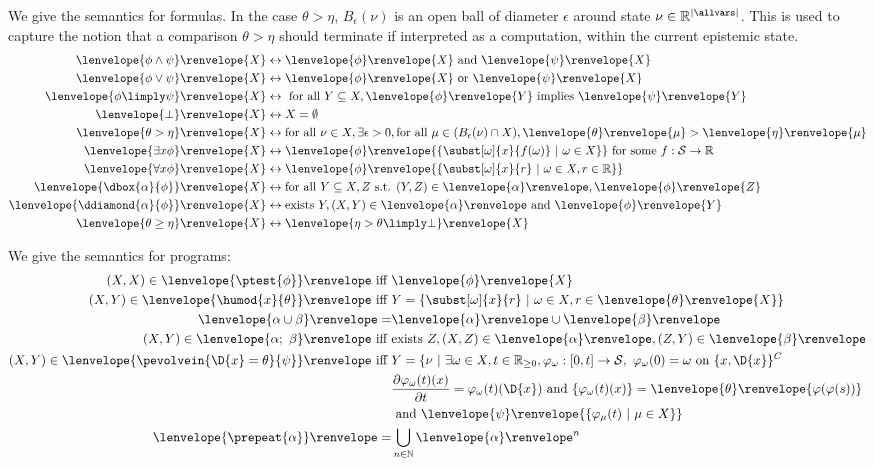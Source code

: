 \documentclass[12pt]{cmuthesis}
\theoremstyle{definition}
\theoremstyle{remark}
\newcommand{\ivr}{\psi}
\newcommand{\allstate}{\mathcal{S}}
\newcommand{\lequiv}{\leftrightarrow}
\newcommand{\om}{\omega}
\newcommand{\tint}[2]{\lenvelope{#1}\renvelope{#2}}
\newcommand{\fint}[1]{\lenvelope{#1}\renvelope}
\newcommand{\pint}[1]{\lenvelope{#1}\renvelope} %
\begin{document}
We give the semantics for formulas.
In the case $\theta > \eta$, $B_\epsilon(\nu)$ is an open ball of diameter $\epsilon$ around state $\nu \in \mathbb{R}^{|\allvars|}$.
This is used to capture the notion that a comparison $\theta > \eta$ should terminate if interpreted as a computation, within the current epistemic state.
\begin{align*}
  \fint{\phi \land \psi}{X}     &\lequiv \fint{\phi}{X}\text{ and }\fint{\psi}{X}\\
  \fint{\phi \lor \psi}{X}      &\lequiv \fint{\phi}{X}\text{ or }\fint{\psi}{X}\\
  \fint{\phi \limply \psi}{X}   &\lequiv \text{ for all }Y \subseteq X, \fint{\phi}{Y}\text{ implies }\fint{\psi}{Y}\\
  \fint{\bot}{X}                &\lequiv X = \emptyset\\
  \fint{\theta > \eta}{X}       &\lequiv \text{for all }\nu \in X, \exists \epsilon > 0, \text{for all } \mu \in (B_\epsilon(\nu) \cap X), \tint{\theta}{\mu} > \tint{\eta}{\mu}\\
  \fint{\exists{x}{\phi}}{X}    &\lequiv \fint{\phi}{\{\subst[\om]{x}{f(\om)}~|~\om \in X\}} \text{ for some $f:\allstate \to \mathbb{R}$}\\
  \fint{\forall{x}{\phi}}{X}    &\lequiv \fint{\phi}{\{\subst[\om]{x}{r}~|~\om \in X,  r \in \mathbb{R}\}}\\
  \fint{\dbox{\alpha}{\phi}}{X} &\lequiv \text{for all }Y \subseteq X, Z \text{ s.t. }(Y,Z) \in \pint{\alpha}, \fint{\phi}{Z}\\
  \fint{\ddiamond{\alpha}{\phi}}{X} &\lequiv \text{exists }Y, (X,Y)\in\pint{\alpha}\text{ and }\fint{\phi}{Y}\\
  \fint{\theta \geq \eta}{X}    &\lequiv \fint{\eta > \theta \limply \bot}{X}%
\end{align*}

We give the semantics for programs:
\begin{align*}
  (X,X) \in \pint{\ptest{\phi}}\text{ iff }&\fint{\phi}{X} \\
  (X,Y) \in \pint{\humod{x}{\theta}} \text{ iff }& Y = \{\subst[\om]{x}{r}~|~\om \in X, r \in \tint{\theta}{X}\}\\
  \pint{\alpha \cup \beta} =& \pint{\alpha} \cup \pint{\beta}\\
  (X,Y) \in \pint{\alpha;~\beta} \text{ iff }& \text{exists }Z, (X,Z) \in \pint{\alpha}, (Z,Y) \in \pint{\beta}\\
  (X,Y) \in \pint{\pevolvein{\D{x}=\theta}{\ivr}}\text{ iff }& Y = \{\nu~|~\exists \om \in X, t \in \mathbb{R}_{\geq0}, \varphi_\om:[0,t]\to\allstate,~\varphi_\om(0)=\om\text{ on }\{x,\D{x}\}^C\\
   &\frac{\partial \varphi_\om(t)(x)}{\partial t}= \varphi_\om(t)(\D{x})\text{ and } \{\varphi_\om(t)(x)\}=\tint{\theta}{\varphi(\varphi(s))}\\
   &\text{ and }\fint{\ivr}{\{\varphi_\mu(t)~|~\mu\in X}\}\\
  \pint{\prepeat{\alpha}} =& \bigcup_{n\in\mathbb{N}} \pint{\alpha}^n
\end{align*}
\end{document}
